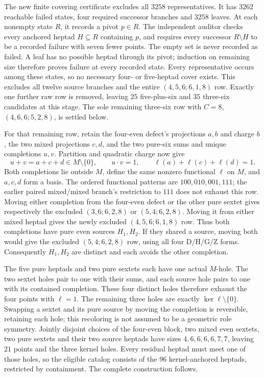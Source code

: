 The new finite covering certificate excludes all $3258$
representatives. It has $3262$ reachable failed states, four
required successor branches and $3258$ leaves. At each nonempty
state $R$, it records a pivot $p\in R$. The independent auditor
checks every anchored heptad $H\subseteq R$ containing $p$,
and requires every successor $R\setminus H$ to be a recorded
failure with seven fewer points. The empty set is never recorded
as failed. A leaf has no possible heptad through its pivot;
induction on remaining size therefore proves failure at every
recorded state. Every representative occurs among these states,
so no necessary four- or five-heptad cover exists. This excludes
all twelve source branches and the entire $(4,5,6;6,1,8)$ row.
Exactly one further raw row is removed, leaving $25$ five-plus-six
and $35$ three-six candidates at this stage. The sole remaining
three-six row with $C=8$, $(4,6,6;5,2,8)$, is settled below.

For that remaining row, retain the four-even defect's projections
$a,b$ and charge $b$, the two mixed projections $c,d$, and the
two pure-six sums and unique completions $u,v$. Partition and
quadratic charge now give
\[
 u+v=a+c+d\in M\setminus\{0\},\qquad u\cdot v=1,
 \qquad \ell(a)+\ell(c)+\ell(d)=1.
\]
Both completions lie outside $M$, define the same nonzero
functional $\ell$ on $M$, and $a,c,d$ form a basis.
The ordered functional patterns are $100,010,001,111$; the earlier
paired mixed/mixed branch's restriction to $111$ does not exhaust
this row. Moving either completion from the four-even defect or
the other pure sextet gives respectively the excluded
$(3,6;6,2,8)$ or $(5,4;6,2,8)$. Moving it from either mixed
heptad gives the newly excluded $(4,5,6;6,1,8)$ row.
Thus both completions have pure even sources $H_1,H_2$.
If they shared a source, moving both would give the excluded
$(5,4;6,2,8)$ row, using all four D/H/G/Z forms.
Consequently $H_1,H_2$ are distinct and each avoids the other
completion.

The five pure heptads and two pure sextets each have one actual
$M$-hole. The two sextet holes pair to one with their sums, and
each source hole pairs to one with its contained completion.
These four distinct holes therefore exhaust the four points
with $\ell=1$. The remaining three holes are exactly
$\ker\ell\setminus\{0\}$. Swapping a sextet and its pure source
by moving the completion is reversible, retaining each hole;
this recoloring is not assumed to be a geometric role symmetry.
Jointly disjoint choices of the four-even block, two mixed even
sextets, two pure sextets and their two source heptads have sizes
$4,6,6,6,6,7,7$, leaving $21$ points and the three kernel holes.
Every residual heptad must meet one of those holes, so the
eligible catalog consists of the $96$ kernel-anchored heptads,
restricted by containment. The complete construction follows.

